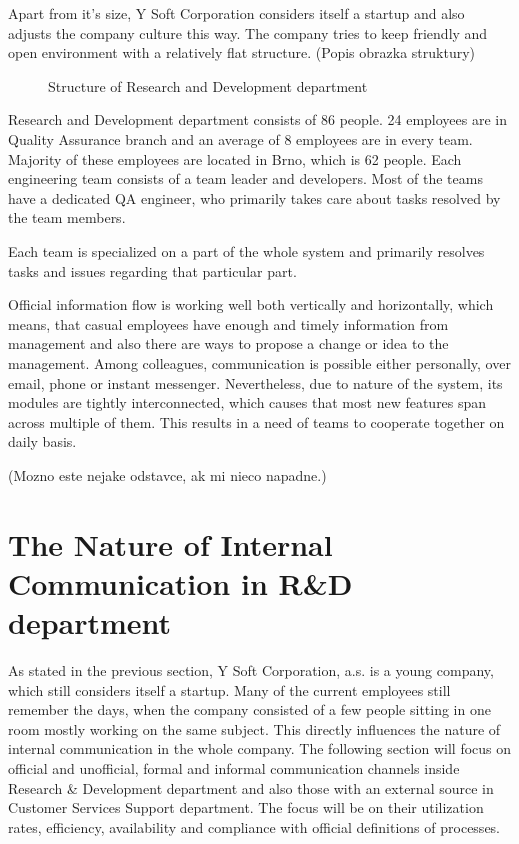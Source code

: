 \documentclass[11pt,singleside]{myfithesis2}
\newcommand{\pict}[4]{
	\begin{figure}[h!]
  		\vspace{-7px}
  		\centerline{\fcolorbox{darkgray}{palegray}{\texttt{[image: \#2]}}}
  		\caption{#1}
  		\label{#4}
	\end{figure}
}
\begin{document}
Apart from it's size, Y Soft Corporation considers itself a startup and also adjusts the company culture this way. The company tries to keep friendly and open environment with a relatively flat structure. (Popis obrazka struktury)

\pict{Structure of Research and Development department}{data/rndStructure.png}{width=0.8\textwidth}{pic:rndStructure}

Research and Development department consists of 86 people. 24 employees are in Quality Assurance branch and an average of 8 employees are in every team. Majority of these employees are located in Brno, which is 62 people. Each engineering team consists of a team leader and developers. Most of the teams have a dedicated QA engineer, who primarily takes care about tasks resolved by the team members.

Each team is specialized on a part of the whole system and primarily resolves tasks and issues regarding that particular part. 

Official information flow is working well both vertically and horizontally, which means, that casual employees have enough and timely information from management and also there are ways to propose a change or idea to the management. Among colleagues, communication is possible either personally, over email, phone or instant messenger. Nevertheless, due to nature of the system, its modules are tightly interconnected, which causes that most new features span across multiple of them. This results in a need of teams to cooperate together on daily basis. 

(Mozno este nejake odstavce, ak mi nieco napadne.)


	\section{The Nature of Internal Communication in R\&D department}
As stated in the previous section, Y Soft Corporation, a.s. is a young company, which still considers itself a startup. Many of the current employees still remember the days, when the company consisted of a few people sitting in one room mostly working on the same subject. This directly influences the nature of internal communication in the whole company. The following section will focus on official and unofficial, formal and informal communication channels inside Research \& Development department and also those with an external source in Customer Services Support department. The focus will be on their utilization rates, efficiency, availability and compliance with official definitions of processes.
\end{document}
